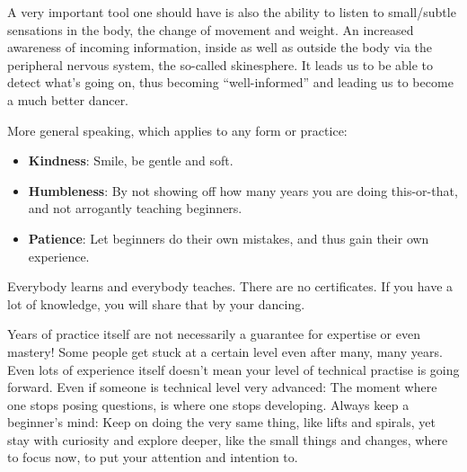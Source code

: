A very important tool one should have is also the ability to listen to small/subtle sensations in the body, the change of movement and weight.
An increased awareness of incoming information, inside as well as outside the body via the peripheral nervous system, the so-called \gls{skinesphere}.
It leads us to be able to detect what's going on, thus becoming ``well-informed'' and leading us to become a much better dancer.

More general speaking, which applies to any form or practice:

\begin{itemize}
    \item \textbf{Kindness}: Smile, be gentle and soft.
    \item \textbf{Humbleness}: By not showing off how many years you are doing this-or-that, and not arrogantly teaching beginners.
    \item \textbf{Patience}: Let beginners do their own mistakes, and thus gain their own experience.
\end{itemize}

Everybody learns and everybody teaches.
There are no certificates.
If you have a lot of knowledge, you will share that by your dancing.

Years of practice itself are not necessarily a guarantee for expertise or even mastery!
Some people get stuck at a certain level even after many, many years.
Even lots of experience itself doesn't mean your level of technical practise is going forward.
Even if someone is technical level very advanced: The moment where one stops posing questions, is where one stops developing.
Always keep a beginner's mind: Keep on doing the very same thing, like lifts and spirals, yet stay with curiosity and explore deeper, like the small things and changes, where to focus now, to put your attention and intention to.

